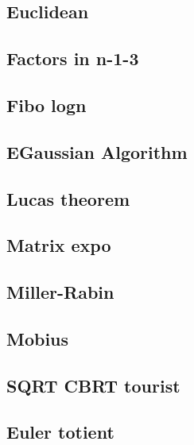 \subsection{Euclidean}
\raggedbottom
\hrulefill
\subsection{Factors in n-1-3}
\raggedbottom
\hrulefill
\subsection{Fibo logn}
\raggedbottom
\hrulefill
\subsection{EGaussian Algorithm}
\raggedbottom
\hrulefill
\subsection{Lucas theorem}
\raggedbottom
\hrulefill
\subsection{Matrix expo}
\raggedbottom
\hrulefill
\subsection{Miller-Rabin}
\raggedbottom
\hrulefill
\subsection{Mobius}
\raggedbottom
\hrulefill
\subsection{SQRT CBRT tourist}
\raggedbottom
\hrulefill
\subsection{Euler totient}
\raggedbottom
\hrulefill

